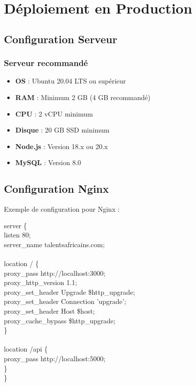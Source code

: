 \documentclass[12pt,a4paper]{article}
\begin{document}
\newpage
\section{Déploiement en Production}

\subsection{Configuration Serveur}

\subsubsection{Serveur recommandé}
\begin{itemize}[leftmargin=*]
    \item \textbf{OS} : Ubuntu 20.04 LTS ou supérieur
    \item \textbf{RAM} : Minimum 2 GB (4 GB recommandé)
    \item \textbf{CPU} : 2 vCPU minimum
    \item \textbf{Disque} : 20 GB SSD minimum
    \item \textbf{Node.js} : Version 18.x ou 20.x
    \item \textbf{MySQL} : Version 8.0
\end{itemize}

\subsection{Configuration Nginx}

Exemple de configuration pour Nginx :

\begin{tcolorbox}[colback=darkcolor!5, colframe=darkcolor, fonttitle=\ttfamily, fontsize=\small]
server \{\\
\quad listen 80;\\
\quad server\_name talentsafricains.com;\\
\\
\quad location / \{\\
\quad\quad proxy\_pass http://localhost:3000;\\
\quad\quad proxy\_http\_version 1.1;\\
\quad\quad proxy\_set\_header Upgrade \$http\_upgrade;\\
\quad\quad proxy\_set\_header Connection 'upgrade';\\
\quad\quad proxy\_set\_header Host \$host;\\
\quad\quad proxy\_cache\_bypass \$http\_upgrade;\\
\quad \}\\
\\
\quad location /api \{\\
\quad\quad proxy\_pass http://localhost:5000;\\
\quad \}\\
\}
\end{tcolorbox}
\end{document}
